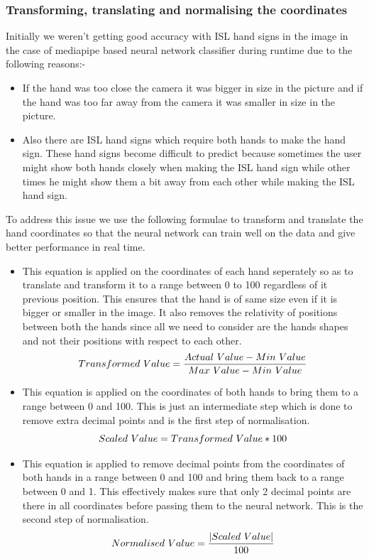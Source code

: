 \documentclass[12pt,a4paper]{report}
\begin{document}
\subsubsection{Transforming, translating and normalising the coordinates}
Initially we weren't getting good accuracy with ISL hand signs in the image in the case of mediapipe based neural network classifier during runtime due to the following reasons:-
\begin{itemize}
	\item If the hand was too close the camera it was bigger in size in the picture and if the hand was too far away from the camera it was smaller in size in the picture.
	\item Also there are ISL hand signs which require both hands to make the hand sign. These hand signs become difficult to predict because sometimes the user might show both hands closely when making the ISL hand sign while other times he might show them a bit away from each other while making the ISL hand sign.
\end{itemize}
To address this issue we use the following formulae to transform and translate the hand coordinates so that the neural network can train well on the data and give better performance in real time.
\begin{itemize}
	\item This equation is applied on the coordinates of each hand seperately so as to translate and transform it to a range between 0 to 100 regardless of it previous position. This ensures that the hand is of same size even if it is bigger or smaller in the image. It also removes the relativity of positions between both the hands since all we need to consider are the hands shapes and not their positions with respect to each other.
	      \begin{equation}
		      Transformed\ Value = \frac{Actual\ Value - Min\ Value}{Max\ Value - Min\ Value} \notag
          \label{Transformation}
	      \end{equation}
	\item This equation is applied on the coordinates of both hands to bring them to a range between 0 and 100. This is just an intermediate step which is done to remove extra decimal points and is the first step of normalisation.
	      \begin{equation}
		      Scaled\ Value = Transformed\ Value * 100 \notag
          \label{Scaling}
	      \end{equation}
	\item This equation is applied to remove decimal points from the coordinates of both hands in a range between 0 and 100 and bring them back to a range between 0 and 1. This effectively makes sure that only 2 decimal points are there in all coordinates before passing them to the neural network. This is the second step of normalisation.
	      \begin{equation}
		      Normalised\ Value = \frac{|Scaled\ Value|}{100} \notag
          \label{Descaling}
	      \end{equation}
\end{itemize}
\end{document}
